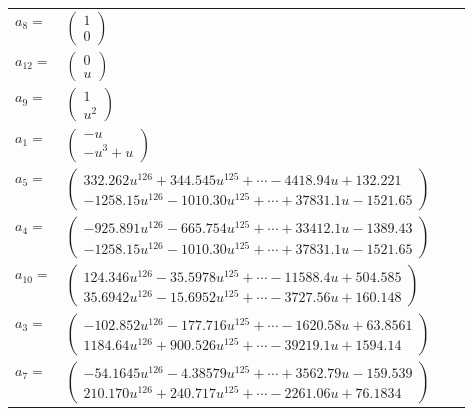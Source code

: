 \documentclass[1p]{elsarticle_modified}
\theoremstyle{definition}
\begin{document}
\begin{tabular}{m{7pt} m{180pt} m{7pt} m{180pt} }
\flushright $a_{8}=$&$\begin{pmatrix}1\\0\end{pmatrix}$ \\
\flushright $a_{12}=$&$\begin{pmatrix}0\\u\end{pmatrix}$ \\
\flushright $a_{9}=$&$\begin{pmatrix}1\\u^2\end{pmatrix}$ \\
\flushright $a_{1}=$&$\begin{pmatrix}- u\\- u^3+u\end{pmatrix}$ \\
\flushright $a_{5}=$&$\begin{pmatrix}332.262 u^{126}+344.545 u^{125}+\cdots-4418.94 u+132.221\\-1258.15 u^{126}-1010.30 u^{125}+\cdots+37831.1 u-1521.65\end{pmatrix}$ \\
\flushright $a_{4}=$&$\begin{pmatrix}-925.891 u^{126}-665.754 u^{125}+\cdots+33412.1 u-1389.43\\-1258.15 u^{126}-1010.30 u^{125}+\cdots+37831.1 u-1521.65\end{pmatrix}$ \\
\flushright $a_{10}=$&$\begin{pmatrix}124.346 u^{126}-35.5978 u^{125}+\cdots-11588.4 u+504.585\\35.6942 u^{126}-15.6952 u^{125}+\cdots-3727.56 u+160.148\end{pmatrix}$ \\
\flushright $a_{3}=$&$\begin{pmatrix}-102.852 u^{126}-177.716 u^{125}+\cdots-1620.58 u+63.8561\\1184.64 u^{126}+900.526 u^{125}+\cdots-39219.1 u+1594.14\end{pmatrix}$ \\
\flushright $a_{7}=$&$\begin{pmatrix}-54.1645 u^{126}-4.38579 u^{125}+\cdots+3562.79 u-159.539\\210.170 u^{126}+240.717 u^{125}+\cdots-2261.06 u+76.1834\end{pmatrix}$ \\

\end{tabular}
\end{document}
